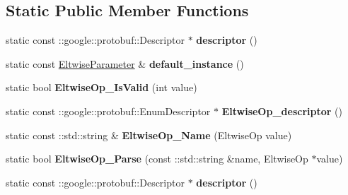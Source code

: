 \subsection*{Static Public Member Functions}
\begin{DoxyCompactItemize}
\item 
\mbox{\label{classcaffe_1_1_eltwise_parameter_a72dc587c3547b0f016d7ac67f34b5ccb}} 
static const \+::google\+::protobuf\+::\+Descriptor $\ast$ {\bfseries descriptor} ()
\item 
\mbox{\label{classcaffe_1_1_eltwise_parameter_a8f9d3138859ababc5763ab630d3faa6d}} 
static const \mbox{\hyperlink{classcaffe_1_1_eltwise_parameter}{Eltwise\+Parameter}} \& {\bfseries default\+\_\+instance} ()
\item 
\mbox{\label{classcaffe_1_1_eltwise_parameter_addecd0ef048eb7ba4eb13fadcfaf86a2}} 
static bool {\bfseries Eltwise\+Op\+\_\+\+Is\+Valid} (int value)
\item 
\mbox{\label{classcaffe_1_1_eltwise_parameter_a0566f8803800660522c3aa591e314589}} 
static const \+::google\+::protobuf\+::\+Enum\+Descriptor $\ast$ {\bfseries Eltwise\+Op\+\_\+descriptor} ()
\item 
\mbox{\label{classcaffe_1_1_eltwise_parameter_aab41aef10f3132cd9dfb45abc028a001}} 
static const \+::std\+::string \& {\bfseries Eltwise\+Op\+\_\+\+Name} (Eltwise\+Op value)
\item 
\mbox{\label{classcaffe_1_1_eltwise_parameter_abc234d7d495e85a9b8447a42b289cb83}} 
static bool {\bfseries Eltwise\+Op\+\_\+\+Parse} (const \+::std\+::string \&name, Eltwise\+Op $\ast$value)
\item 
\mbox{\label{classcaffe_1_1_eltwise_parameter_aa55bf9e49a1f446371e9104293cc5efa}} 
static const \+::google\+::protobuf\+::\+Descriptor $\ast$ {\bfseries descriptor} ()
\item 
\mbox{\label{classcaffe_1_1_eltwise_parameter_ab0e4df42e98249ccfde45c03a59e851c}} 

\end{DoxyCompactItemize}
